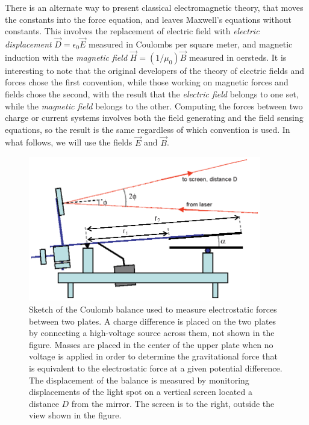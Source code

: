 \documentclass{revtex4}
\begin{document}
There is an alternate way to present classical electromagnetic theory, that
moves the constants into the force equation, and leaves Maxwell's equations
without constants.  This involves the replacement of electric field with
{\em electric displacement} $\vec{D}=\epsilon_0\vec{E}$ measured in
Coulombs per square meter, and magnetic induction with the {\em magnetic
field} $\vec{H}=(1/\mu_0)\vec{B}$ measured in oersteds.  It
is interesting to note that the original developers of the theory of
electric fields and forces chose the first convention, while those working
on magnetic forces and fields chose the second, with the result that the
{\em electric field} belongs to one set, while the {\em magnetic field}
belongs to the other.  Computing the forces between two charge or
current systems involves both the field generating and the field sensing
equations, so the result is the same regardless of which convention is
used.  In what follows, we will use the fields $\vec{E}$ and $\vec{B}$.

\begin{figure}
\includegraphics[width=4in]{coulbal.eps}
\caption{\label{fig:coulbal}
Sketch of the Coulomb balance used to measure electrostatic forces between
two plates.  A charge difference is placed on the two plates by connecting
a high-voltage source across them, not shown in the figure.  Masses are
placed in the center of the upper plate when no voltage is applied in order
to determine the gravitational force that is equivalent to the electrostatic
force at a given potential difference.  The displacement of the balance is
measured by monitoring displacements of the light spot on a vertical screen
located a distance $D$ from the mirror.  The screen is to the right, outside
the view shown in the figure.
}
\end{figure}
\end{document}
